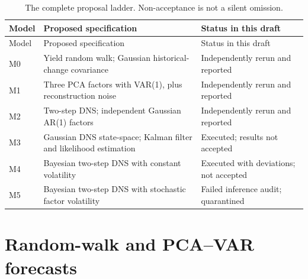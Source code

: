 \documentclass[
  12pt,
  letterpaper,
  DIV=11,
  numbers=noendperiod]{scrreprt}
\begin{document}
\begin{longtable}[]{@{}
  >{\raggedright\arraybackslash}p{}
  >{\raggedright\arraybackslash}p{}
  >{\raggedright\arraybackslash}p{}@{}}
\caption{The complete proposal ladder. Non-acceptance is not a silent
omission.}\label{tbl-ladder}\tabularnewline
\toprule\noalign{}
\begin{minipage}[b]{\linewidth}\raggedright
Model
\end{minipage} & \begin{minipage}[b]{\linewidth}\raggedright
Proposed specification
\end{minipage} & \begin{minipage}[b]{\linewidth}\raggedright
Status in this draft
\end{minipage} \\
\midrule\noalign{}
\endfirsthead
\toprule\noalign{}
\begin{minipage}[b]{\linewidth}\raggedright
Model
\end{minipage} & \begin{minipage}[b]{\linewidth}\raggedright
Proposed specification
\end{minipage} & \begin{minipage}[b]{\linewidth}\raggedright
Status in this draft
\end{minipage} \\
\midrule\noalign{}
\endhead
\bottomrule\noalign{}
\endlastfoot
M0 & Yield random walk; Gaussian historical-change covariance &
Independently rerun and reported \\
M1 & Three PCA factors with VAR(1), plus reconstruction noise &
Independently rerun and reported \\
M2 & Two-step DNS; independent Gaussian AR(1) factors & Independently
rerun and reported \\
M3 & Gaussian DNS state-space; Kalman filter and likelihood estimation &
Executed; results not accepted \\
M4 & Bayesian two-step DNS with constant volatility & Executed with
deviations; not accepted \\
M5 & Bayesian two-step DNS with stochastic factor volatility & Failed
inference audit; quarantined \\
\end{longtable}

\section{Random-walk and PCA--VAR
forecasts}\label{random-walk-and-pcavar-forecasts}
\end{document}

